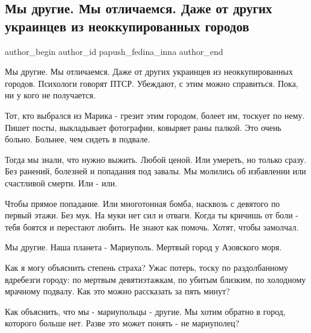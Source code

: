  
 
 
 
 
 
\subsection{Мы другие. Мы отличаемся. Даже от других украинцев из неоккупированных городов}
\label{sec:24_05_2022.fb.papush_fedina_inna.1.my_drugie}
 
\ifcmt
 author_begin
   author_id papush_fedina_inna
 author_end
\fi

Мы другие. Мы отличаемся. Даже от других украинцев из неоккупированных городов.
Психологи говорят ПТСР. Убеждают,  с этим можно справиться. Пока, ни у кого не
получается. 

Тот, кто выбрался из Марика - грезит этим городом, болеет им, тоскует по
нему. Пишет посты, выкладывает фотографии, ковыряет раны палкой. Это очень
больно. Больнее, чем сидеть в подвале. 


Тогда мы знали, что нужно выжить. Любой ценой. Или умереть, но только сразу.
Без ранений, болезней и попадания под завалы. Мы молились об избавлении или
счастливой смерти. Или - или. 

Чтобы прямое попадание. Или многотонная бомба, насквозь с девятого по первый
этажи.  Без мук. На муки нет сил и отваги. Когда ты кричишь от боли -  тебя
боятся и перестают любить. Не знают как помочь. Хотят, чтобы замолчал.

Мы другие. Наша планета -  Мариуполь. Мертвый город у Азовского моря.

Как я могу объяснить степень страха?  Ужас потерь, тоску по раздолбанному
вдребезги городу: по  мертвым девятиэтажкам, по убитым  близким, по холодному
мрачному подвалу. Как это можно рассказать за пять минут? 

Как объяснить, что мы - мариупольцы - другие. Мы хотим обратно в город,
которого больше нет. Разве это может понять - не мариуполец? 

